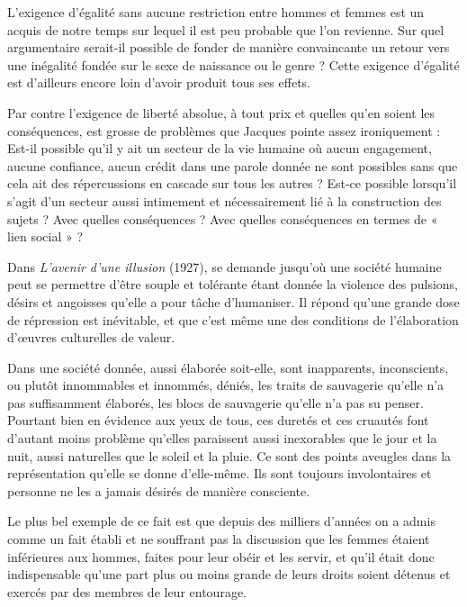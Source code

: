  L'exigence d'égalité sans aucune restriction entre hommes et femmes est un acquis de notre temps sur lequel il est peu probable que l'on revienne. Sur quel argumentaire serait-il possible de fonder de manière convaincante un retour vers une inégalité fondée sur le sexe de naissance ou le genre ? Cette exigence d'égalité est d'ailleurs encore loin d'avoir produit tous ses effets. 
 
 Par contre l'exigence de liberté absolue, à tout prix et quelles qu'en soient les conséquences, est grosse de problèmes que Jacques  pointe assez ironiquement :  Est-il possible qu'il y ait un secteur de la vie humaine où aucun engagement, aucune confiance, aucun crédit dans une parole donnée ne sont possibles sans que cela ait des répercussions en cascade sur tous les autres ? Est-ce possible lorsqu'il s'agit d'un secteur aussi intimement et nécessairement lié à la construction des sujets ? Avec quelles conséquences ? Avec quelles conséquences en termes de « lien social » ?
 
 
 Dans \emph{L'avenir d'une illusion} (1927),  se demande jusqu'où une société humaine peut se permettre d'être souple et tolérante étant donnée la violence des pulsions, désirs et angoisses qu'elle a pour tâche d'humaniser. Il répond qu'une grande dose de répression est inévitable, et que c'est même une des conditions de l'élaboration d'œuvres culturelles de valeur.

 Dans une société donnée, aussi élaborée soit-elle, sont inapparents, inconscients, ou plutôt innommables et innommés, déniés, les traits de sauvagerie qu'elle n'a pas suffisamment élaborés, les blocs de sauvagerie qu'elle n'a pas su penser. Pourtant bien en évidence aux yeux de tous, ces duretés et ces cruautés font d'autant moins problème qu'elles paraissent aussi inexorables que le jour et la nuit, aussi naturelles que le soleil et la pluie. Ce sont des points aveugles dans la représentation qu'elle se donne d'elle-même. Ils sont toujours involontaires et personne ne les a jamais désirés de manière consciente. 

 Le plus bel exemple de ce fait est que depuis des milliers d'années on a admis comme un fait établi et ne souffrant pas la discussion que les femmes étaient inférieures aux hommes, faites pour leur obéir et les servir, et qu'il était donc indispensable qu'une part plus ou moins grande de leurs droits soient détenus et exercés par des membres de leur entourage. 

